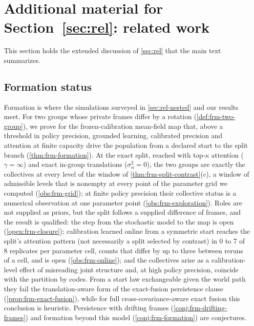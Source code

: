 \section{Additional material for \texorpdfstring{Section~\ref{sec:rel}}{Section 17}: related work}\label{sup:rel}

This section holds the extended discussion of \cref{sec:rel} that the main text summarizes.

\subsection{Formation status}\label{sup:rel-formation-status}

Formation is where the simulations surveyed in \cref{sec:rel-nested} and our results meet. For two groups whose private frames differ by a rotation (\cref{def:frm-two-group}), we prove for the frozen-calibration mean-field map that, above a threshold in policy precision, grounded learning, calibrated precision and attention at finite capacity drive the population from a declared start to the split branch (\cref{thm:frm-formation}). At the exact split, reached with top-$\kappa$ attention ($\gamma=\infty$) and exact in-group translations ($\sigma_\alpha^2=0$), the two groups are exactly the collectives at every level of the window of \cref{thm:frm-split-contrast}(c), a window of admissible levels that is nonempty at every point of the parameter grid we computed (\cref{obs:frm-grid}); at finite policy precision their collective status is a numerical observation at one parameter point (\cref{obs:frm-exploration}). Roles are not supplied as priors, but the split follows a supplied difference of frames, and the result is qualified: the step from the stochastic model to the map is open (\cref{open:frm-closure}); calibration learned online from a symmetric start reaches the split's attention pattern (not necessarily a split selected by contrast) in 0 to 7 of 8 replicates per parameter cell, counts that differ by up to three between reruns of a cell, and is open (\cref{obs:frm-online}); and the collectives arise as a calibration-level effect of misreading joint structure and, at high policy precision, coincide with the partition by codes. From a start law exchangeable given the world path they fail the translation-aware form of the exact-fusion persistence clause (\cref{prop:frm-exact-fusion}), while for full cross-covariance-aware exact fusion this conclusion is heuristic. Persistence with drifting frames (\cref{conj:frm-drifting-frames}) and formation beyond this model (\cref{conj:frm-formation}) are conjectures.

